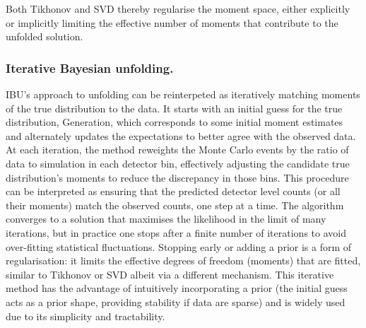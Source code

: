 {{            Both Tikhonov and SVD thereby regularise the moment space, either explicitly or implicitly limiting the effective number of moments that contribute to the unfolded solution.
        \subsubsection{Iterative Bayesian unfolding.}
            IBU's approach to unfolding can be reinterpeted as iteratively matching moments of the true distribution to the data.
            It starts with an initial guess for the true distribution, Generation, which corresponds to some initial moment estimates and alternately updates the expectations to better agree with the observed data.
            At each iteration, the method reweights the Monte Carlo events by the ratio of data to simulation in each detector bin, effectively adjusting the candidate true distribution's moments to reduce the discrepancy in those bins.
            This procedure can be interpreted as ensuring that the predicted detector level counts (or all their moments) match the observed counts, one step at a time.
            The algorithm converges to a solution that maximises the likelihood in the limit of many iterations, but in practice one stops after a finite number of iterations to avoid over-fitting statistical fluctuations.
            Stopping early or adding a prior is a form of regularisation: it limits the effective degrees of freedom (moments) that are fitted, similar to Tikhonov or SVD albeit via a different mechanism.
            This iterative method has the advantage of intuitively incorporating a prior (the initial guess acts as a prior shape, providing stability if data are sparse) and is widely used due to its simplicity and tractability.
        
}}

